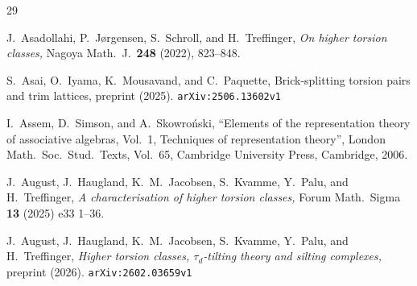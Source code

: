 \documentclass[12pt,reqno]{amsart}
\numberwithin{equation}{section}
\theoremstyle{definition}
\theoremstyle{theorem}
\theoremstyle{definition}
\begin{document}
\begin{thebibliography}{29}



 J.\ Asadollahi, P.\ J\o rgensen, S.\ Schroll, and H.\ Treffinger, {\it On higher torsion classes,} Nagoya Math.\ J.\ {\bf 248} (2022), 823--848.

  S.\ Asai, O.\ Iyama, K.\ Mousavand, and C.\ Paquette, Brick-splitting torsion pairs and trim lattices, preprint (2025).  {\tt arXiv:2506.13602v1}

  I.\ Assem, D.\ Simson, and A.\ Skowro\'nski, ``Elements of the representation theory of associative algebras, Vol.\ 1, Techniques of representation theory'', London Math.\ Soc.\ Stud.\ Texts, Vol.\ 65, Cambridge University Press, Cambridge, 2006.

  J.\ August, J.\ Haugland, K.\ M.\ Jacobsen, S.\ Kvamme, Y.\ Palu, and H.\ Treffinger, {\it A characterisation of higher torsion classes,} Forum Math.\ Sigma {\bf 13} (2025) e33 1--36.

  J.\ August, J.\ Haugland, K.\ M.\ Jacobsen, S.\ Kvamme, Y.\ Palu, and H.\ Treffinger, {\it Higher torsion classes, $\tau_d$-tilting theory and silting complexes,} preprint (2026).  {\tt arXiv:2602.03659v1}





\end{thebibliography}
\end{document}
